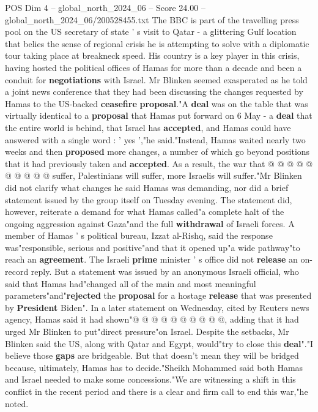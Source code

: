 \begin{textsample}{POS Dim 4 – global\_north\_2024\_06 – Score 24.00 – global\_north\_2024\_06/200528455.txt}  \label{ex:f4_pos_136}
The BBC is part of the travelling press pool on the US secretary of state ' s visit to Qatar - a glittering Gulf location that belies the sense of regional crisis he is attempting to solve with a diplomatic tour taking place at breakneck speed.
His country is a key player in this crisis, having hosted the political offices of Hamas for more than a decade and been a conduit for \textbf{negotiations} with Israel.
Mr Blinken seemed exasperated as he told a joint news conference that they had been discussing the changes requested by Hamas to the US-backed \textbf{ceasefire} \textbf{proposal}."A \textbf{deal} was on the table that was virtually identical to a \textbf{proposal} that Hamas put forward on 6 May - a \textbf{deal} that the entire world is behind, that Israel has \textbf{accepted}, and Hamas could have answered with a single word : ' yes ',"he said."Instead, Hamas waited nearly two weeks and then \textbf{proposed} more changes, a number of which go beyond positions that it had previously taken and \textbf{accepted}.
As a result, the war that @ @ @ @ @ @ @ @ @ @ suffer, Palestinians will suffer, more Israelis will suffer."Mr Blinken did not clarify what changes he said Hamas was demanding, nor did a brief statement issued by the group itself on Tuesday evening.
The statement did, however, reiterate a demand for what Hamas called"a complete halt of the ongoing aggression against Gaza"and the full \textbf{withdrawal} of Israeli forces.
A member of Hamas ' s political bureau, Izzat al-Rishq, said the response was"responsible, serious and positive"and that it opened up"a wide pathway"to reach an \textbf{agreement}.
The Israeli \textbf{prime} minister ' s office did not \textbf{release} an on-record reply.
But a statement was issued by an anonymous Israeli official, who said that Hamas had"changed all of the main and most meaningful parameters"and"\textbf{rejected} the \textbf{proposal} for a hostage \textbf{release} that was presented by \textbf{President} Biden".
In a later statement on Wednesday, cited by Reuters news agency, Hamas said it had shown"@ @ @ @ @ @ @ @ @ @, adding that it had urged Mr Blinken to put"direct pressure"on Israel.
Despite the setbacks, Mr Blinken said the US, along with Qatar and Egypt, would"try to close this \textbf{deal}"."I believe those \textbf{gaps} are bridgeable.
But that doesn't mean they will be bridged because, ultimately, Hamas has to decide."Sheikh Mohammed said both Hamas and Israel needed to make some concessions."We are witnessing a shift in this conflict in the recent period and there is a clear and firm call to end this war,"he noted.

\end{textsample}
